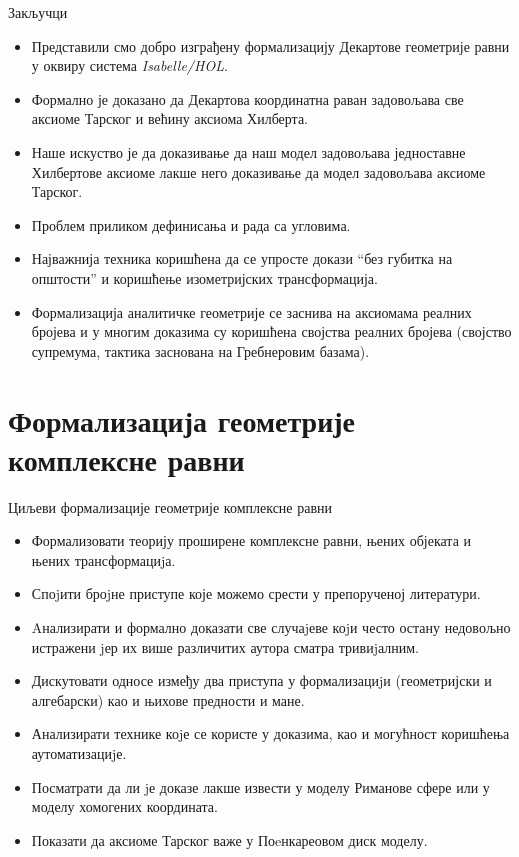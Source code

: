 \documentclass[slidestop, compress, mathserif, containsverbatim, xcolor=dvipsnames]{beamer}
\begin{document}
\begin{frame}[shrink]{Закључци}
  \begin{itemize}
  \item Представили смо добро изграђену формализацију Декартове
    геометрије равни у оквиру система \emph{Isabelle/HOL}.
  \item Формално је доказано да Декартова координатна раван задовољава
    све аксиоме Тарског и већину аксиома Хилберта.
  \item Наше искуство је да доказивање да наш модел задовољава
    једноставне Хилбертове аксиоме лакше него доказивање да модел
    задовољава аксиоме Тарског.
  \item Проблем приликом дефинисања и рада са угловима.
  \item Најважнија техника коришћена да се упросте докази ``без
    губитка на општости'' и коришћење изометријских трансформација.
  \item Формализација аналитичке геометрије се заснива на аксиомама
    реалних бројева и у многим доказима су коришћена својства реалних
    бројева (својство супремума, тактика заснована на Гребнеровим
    базама).
  \end{itemize}
\end{frame}


\section{Формализација геометрије комплексне равни}

\begin{frame}[shrink]{Циљеви формализације геометрије комплексне равни}
  \begin{itemize}
  \item Формализовати теорију проширене комплексне равни, њених
    објеката и њених трансформациjа.
  \item Споjити броjне приступе које можемо срести у препорученој
    литератури.
  \item Aнализирати и формално доказати све случаjеве коjи често
    остану недовољно истражени jер их више различитих аутора сматра
    тривиjалним.
  \item Дискутовати односе између два приступа у формализациjи
    (геометријски и алгебарски) као и њихове предности и мане.
  \item Анализирати технике коjе се користе у доказима, као и
    могућност коришћења аутоматизациjе.
  \item Посматрати да ли jе доказе лакше извести у моделу Риманове
    сфере или у моделу хомогених координата.
  \item Показати да аксиоме Тарског важе у Поeнкареовом диск моделу.
  \end{itemize}
\end{frame}
\end{document}
